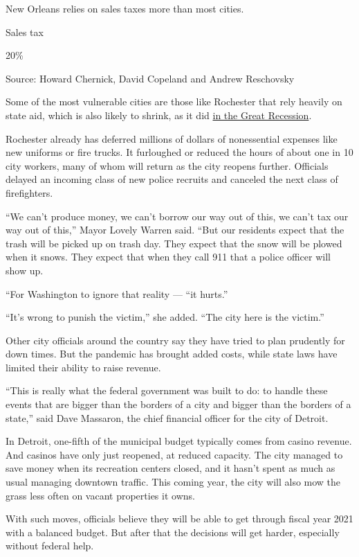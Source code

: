 New Orleans relies on sales taxes more than most cities.

Sales tax

20\%

Source: Howard Chernick, David Copeland and Andrew Reschovsky

Some of the most vulnerable cities are those like Rochester that rely
heavily on state aid, which is also likely to shrink, as it did
\href{https://www.brookings.edu/articles/state-and-local-budgets-and-the-great-recession/}{in
the Great Recession}.

Rochester already has deferred millions of dollars of nonessential
expenses like new uniforms or fire trucks. It furloughed or reduced the
hours of about one in 10 city workers, many of whom will return as the
city reopens further. Officials delayed an incoming class of new police
recruits and canceled the next class of firefighters.

``We can't produce money, we can't borrow our way out of this, we can't
tax our way out of this,'' Mayor Lovely Warren said. ``But our residents
expect that the trash will be picked up on trash day. They expect that
the snow will be plowed when it snows. They expect that when they call
911 that a police officer will show up.

``For Washington to ignore that reality --- ``it hurts.''

``It's wrong to punish the victim,'' she added. ``The city here is the
victim.''

Other city officials around the country say they have tried to plan
prudently for down times. But the pandemic has brought added costs,
while state laws have limited their ability to raise revenue.

``This is really what the federal government was built to do: to handle
these events that are bigger than the borders of a city and bigger than
the borders of a state,'' said Dave Massaron, the chief financial
officer for the city of Detroit.

In Detroit, one-fifth of the municipal budget typically comes from
casino revenue. And casinos have only just reopened, at reduced
capacity. The city managed to save money when its recreation centers
closed, and it hasn't spent as much as usual managing downtown traffic.
This coming year, the city will also mow the grass less often on vacant
properties it owns.

With such moves, officials believe they will be able to get through
fiscal year 2021 with a balanced budget. But after that the decisions
will get harder, especially without federal help.

